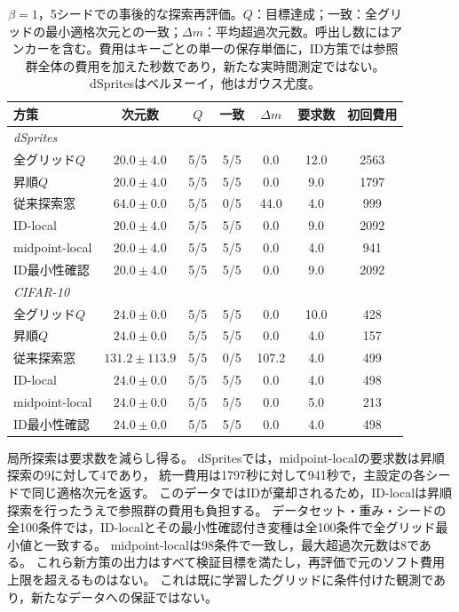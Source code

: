 \documentclass[11pt,a4paper]{ltjsarticle}
\begin{document}
\begin{table}[H]
\caption{$\beta=1$，5シードでの事後的な探索再評価。$Q$：目標達成；一致：全グリッドの最小適格次元との一致；$\Delta m$：平均超過次元数。呼出し数にはアンカーを含む。費用はキーごとの単一の保存単価に，ID方策では参照群全体の費用を加えた秒数であり，新たな実時間測定ではない。dSpritesはベルヌーイ，他はガウス尤度。}\label{tab:replay2}
\small
\setlength{\tabcolsep}{3pt}
\begin{tabular*}{\textwidth}{@{\extracolsep{\fill}}lcccccc@{}}
\toprule
方策 & 次元数 & $Q$ & 一致 & $\Delta m$ & 要求数 & 初回費用 \\
\midrule
\multicolumn{7}{l}{\emph{dSprites}} \\
全グリッド$Q$ & $20.0 \pm 4.0$ & 5/5 & 5/5 & 0.0 & 12.0 & 2563 \\
昇順$Q$ & $20.0 \pm 4.0$ & 5/5 & 5/5 & 0.0 & 9.0 & 1797 \\
従来探索窓 & $64.0 \pm 0.0$ & 5/5 & 0/5 & 44.0 & 4.0 & 999 \\
ID-local & $20.0 \pm 4.0$ & 5/5 & 5/5 & 0.0 & 9.0 & 2092 \\
midpoint-local & $20.0 \pm 4.0$ & 5/5 & 5/5 & 0.0 & 4.0 & 941 \\
ID最小性確認 & $20.0 \pm 4.0$ & 5/5 & 5/5 & 0.0 & 9.0 & 2092 \\
\midrule
\multicolumn{7}{l}{\emph{CIFAR-10}} \\
全グリッド$Q$ & $24.0 \pm 0.0$ & 5/5 & 5/5 & 0.0 & 10.0 & 428 \\
昇順$Q$ & $24.0 \pm 0.0$ & 5/5 & 5/5 & 0.0 & 4.0 & 157 \\
従来探索窓 & $131.2 \pm 113.9$ & 5/5 & 0/5 & 107.2 & 4.0 & 499 \\
ID-local & $24.0 \pm 0.0$ & 5/5 & 5/5 & 0.0 & 4.0 & 498 \\
midpoint-local & $24.0 \pm 0.0$ & 5/5 & 5/5 & 0.0 & 5.0 & 213 \\
ID最小性確認 & $24.0 \pm 0.0$ & 5/5 & 5/5 & 0.0 & 4.0 & 498 \\
\bottomrule\end{tabular*}
\end{table}

局所探索は要求数を減らし得る。
dSpritesでは，midpoint-localの要求数は昇順探索の9に対して4であり，
統一費用は1797秒に対して941秒で，主設定の各シードで同じ適格次元を返す。
このデータではIDが棄却されるため，ID-localは昇順探索を行ったうえで参照群の費用も負担する。
データセット・重み・シードの全100条件では，ID-localとその最小性確認付き変種は全100条件で全グリッド最小値と一致する。
midpoint-localは98条件で一致し，最大超過次元数は8である。
これら新方策の出力はすべて検証目標を満たし，再評価で元のソフト費用上限を超えるものはない。
これは既に学習したグリッドに条件付けた観測であり，新たなデータへの保証ではない。
\end{document}
